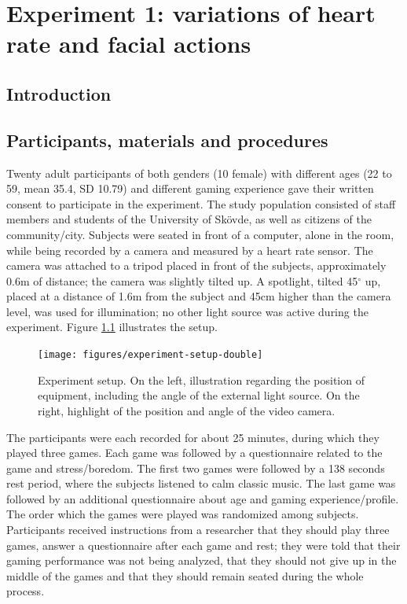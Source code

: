 \chapter{Experiment 1: variations of heart rate and facial actions}

\section{Introduction}

\section{Participants, materials and procedures}

Twenty adult participants of both genders (10 female) with different ages (22 to 59, mean 35.4, SD 10.79) and different gaming experience gave their written consent to participate in the experiment. The study population consisted of staff members and students of the University of Sk\"ovde, as well as citizens of the community/city. Subjects were seated in front of a computer, alone in the room, while being recorded by a camera and measured by a heart rate sensor. The camera was attached to a tripod placed in front of the subjects, approximately 0.6m of distance; the camera was slightly tilted up. A spotlight, tilted 45$^{\circ}$ up, placed at a distance of 1.6m from the subject and 45cm higher than the camera level, was used for illumination; no other light source was active during the experiment. Figure \ref{fig:setup} illustrates the setup.

\begin{figure}
\centering
\texttt{[image: figures/experiment-setup-double]}
\caption{Experiment setup. On the left, illustration regarding the position of equipment, including the angle of the external light source. On the right, highlight of the position and angle of the video camera.}
\label{fig:setup}
\end{figure}

The participants were each recorded for about 25 minutes, during which they played three games. Each game was followed by a questionnaire related to the game and stress/boredom. The first two games were followed by a 138 seconds rest period, where the subjects listened to calm classic music. The last game was followed by an additional questionnaire about age and gaming experience/profile. The order which the games were played was randomized among subjects. Participants received instructions from a researcher that they should play three games, answer a questionnaire after each game and rest; they were told that their gaming performance was not being analyzed, that they should not give up in the middle of the games and that they should remain seated during the whole process.

